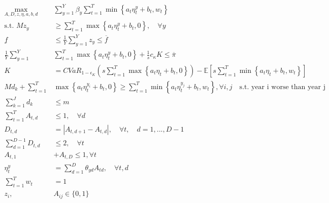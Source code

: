 \documentclass[11pt]{article}
\begin{document}
    \begin{align}
      \max_{A,D,z,\eta,a,b,d} &\sum_{y=1}^{Y} \beta_y \sum_{t=1}^{T} \min \left \{ a_t \eta^y_t +b_t, w_t \right \}  \\
        \text{s.t.   } Mz_y &\geq \sum_{t=1}^{T} \max \left \{a_t \eta_t^y + b_t,0 \right \}, \quad \forall y\\
        \underline{f} &\leq \frac{1}{Y} \sum_{y=1}^{Y} z_y \leq \overline{f}\\
        \frac{1}{Y} \sum_{y=1}^{Y} & \sum_{t=1}^{T} \max \left \{a_t \eta^y_t + b_t,0 \right \} + \frac{1}{s}c_{\kappa}K \leq \overline{\pi}\\
        K &= CVaR_{1-\epsilon_K} \left ( s\sum_{t=1}^{T} \max \left \{ a_t \eta_t + b_t,0 \right \} \right ) - \mathbb{E} \left [ s\sum_{t=1}^{T} \min \left \{ a_t \eta_t +b_t, w_t \right \} \right ]\\
        Md_k + \sum_{t=1}^{T} &\max \left \{a_t \eta_t^{y_i} + b_t,0 \right \} \geq \sum_{t=1}^{T} \min \left \{a_t \eta_t^{y_j} + b_t,w_t \right \}, \forall i, j \quad \text{s.t. year i worse than year j}\\
        \sum_{k=1}^{J} d_k &\leq m\\
        \sum_{t=1}^{T} A_{t,d} &\leq 1, \quad \forall d \\ 
        D_{t,d} &= |A_{t,d+1}-A_{t,d}|, \quad \forall t, \quad d=1,...,D-1\\
        \sum_{d=1}^{D-1} D_{t,d} &\leq 2, \quad \forall t \\
        A_{t,1} &+ A_{t,D} \leq 1, \forall t \\
        \eta_t^y &= \sum_{d=1}^{D} \theta_{yd}A_{td}, \quad \forall t,d \\
        \sum_{t=1}^T w_t &= 1\\
        z_i, & A_{ij} \in \{ 0,1\}
    \end{align}
\end{document}

